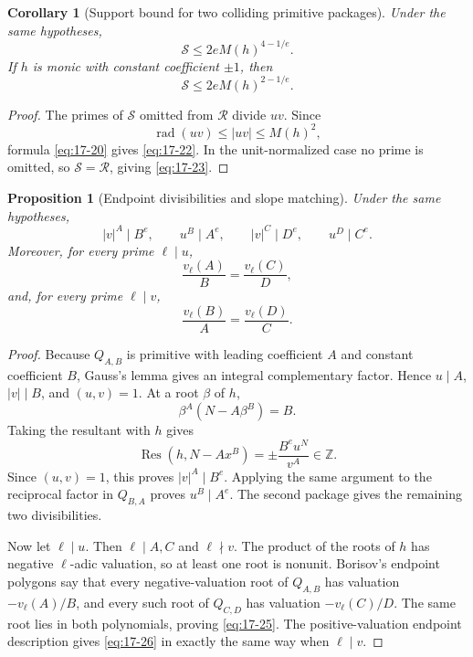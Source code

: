 \documentclass[11pt]{article}
\numberwithin{equation}{section}
\newtheorem{proposition}[theorem]{Proposition}
\newtheorem{corollary}[theorem]{Corollary}
\theoremstyle{definition}
\newcommand{\Z}{\mathbb Z}
\newcommand{\Res}{\operatorname{Res}}
\begin{document}
\begin{corollary}[Support bound for two colliding primitive packages]
\label{cor:supportbound}
Under the same hypotheses,
\begin{equation}
 \mathcal S\leq2eM(h)^{4-1/e}.
 \label{eq:17-22}
\end{equation}
If \(h\) is monic with constant coefficient \(\pm1\), then
\begin{equation}
 \mathcal S\leq2eM(h)^{2-1/e}.
 \label{eq:17-23}
\end{equation}
\end{corollary}

\begin{proof}
The primes of \(\mathcal S\) omitted from \(\mathcal R\) divide \(uv\).
Since
\[
 \operatorname{rad}(uv)\leq|uv|\leq M(h)^2,
\]
formula \eqref{eq:17-20} gives \eqref{eq:17-22}.  In the unit-normalized case no prime
is omitted, so \(\mathcal S=\mathcal R\), giving \eqref{eq:17-23}.
\end{proof}

\begin{proposition}[Endpoint divisibilities and slope matching]
\label{prop:endpointarith}
Under the same hypotheses,
\begin{equation}
 |v|^A\mid B^e,
 \qquad u^B\mid A^e,
 \qquad |v|^C\mid D^e,
 \qquad u^D\mid C^e.
 \label{eq:17-24}
\end{equation}
Moreover, for every prime \(\ell\mid u\),
\begin{equation}
 \frac{v_\ell(A)}B=\frac{v_\ell(C)}D,
 \label{eq:17-25}
\end{equation}
and, for every prime \(\ell\mid v\),
\begin{equation}
 \frac{v_\ell(B)}A=\frac{v_\ell(D)}C.
 \label{eq:17-26}
\end{equation}
\end{proposition}

\begin{proof}
Because \(Q_{A,B}\) is primitive with leading coefficient \(A\) and
constant coefficient \(B\), Gauss's lemma gives an integral complementary
factor.  Hence \(u\mid A\), \(|v|\mid B\), and \((u,v)=1\).
At a root \(\beta\) of \(h\),
\[
 \beta^A(N-A\beta^B)=B.
\]
Taking the resultant with \(h\) gives
\begin{equation}
 \Res(h,N-Ax^B)
 =\pm\frac{B^eu^N}{v^A}\in\Z.
 \label{eq:17-27}
\end{equation}
Since \((u,v)=1\), this proves \(|v|^A\mid B^e\).  Applying the same
argument to the reciprocal factor in \(Q_{B,A}\) proves
\(u^B\mid A^e\).  The second package gives the remaining two divisibilities.

Now let \(\ell\mid u\).  Then \(\ell\mid A,C\) and \(\ell\nmid v\).
The product of the roots of \(h\) has negative \(\ell\)-adic valuation, so
at least one root is nonunit.  Borisov's endpoint polygons say that every
negative-valuation root of \(Q_{A,B}\) has valuation
\(-v_\ell(A)/B\), and every such root of \(Q_{C,D}\) has valuation
\(-v_\ell(C)/D\).  The same root lies in both polynomials, proving
\eqref{eq:17-25}.  The positive-valuation endpoint description gives
\eqref{eq:17-26} in exactly the same way when \(\ell\mid v\).
\end{proof}
\end{document}
